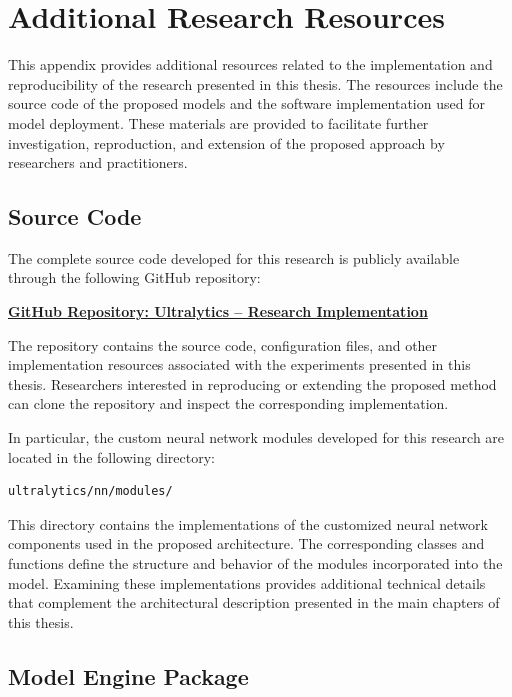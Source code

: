 \appendix

\section{Additional Research Resources}
\label{appendix:additional-resources}

This appendix provides additional resources related to the implementation and
reproducibility of the research presented in this thesis. The resources include
the source code of the proposed models and the software implementation used
for model deployment. These materials are provided to facilitate further
investigation, reproduction, and extension of the proposed approach by
researchers and practitioners.

\subsection{Source Code}

The complete source code developed for this research is publicly available
through the following GitHub repository:

\begin{center}
\href{https://github.com/chhaytheanly/ultralytics}
{\textbf{GitHub Repository: Ultralytics -- Research Implementation}}
\end{center}

The repository contains the source code, configuration files, and other
implementation resources associated with the experiments presented in this
thesis. Researchers interested in reproducing or extending the proposed
method can clone the repository and inspect the corresponding implementation.

In particular, the custom neural network modules developed for this research
are located in the following directory:

\begin{verbatim}
ultralytics/nn/modules/
\end{verbatim}

This directory contains the implementations of the customized neural network
components used in the proposed architecture. The corresponding classes and
functions define the structure and behavior of the modules incorporated into
the model. Examining these implementations provides additional technical
details that complement the architectural description presented in the main
chapters of this thesis.

\subsection{Model Engine Package}

